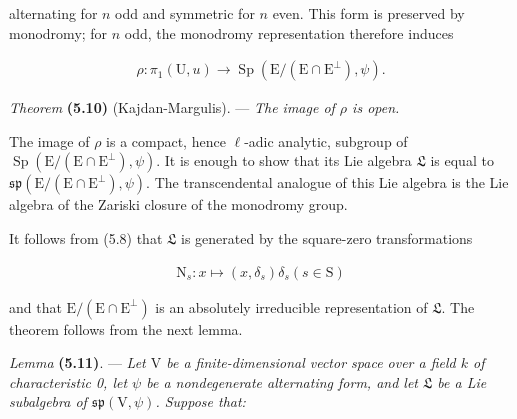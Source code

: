 \documentclass[10pt,leqno]{article}
\begin{document}
\noindent alternating for \(n\) odd and symmetric for \(n\) even. This form is preserved by monodromy; for \(n\) odd, the monodromy representation therefore induces\par

\begin{equation*}\begin{gathered}\rho  : \pi _{1}(\mathrm{U},u) \longrightarrow  \operatorname{Sp}(\mathrm{E}/(\mathrm{E}\cap \mathrm{E}^{\perp }),\psi ).\end{gathered}\end{equation*}

\noindent \emph{Theorem} \textbf{(5.10)} (Kajdan-Margulis). — {\itshape The image of \(\rho \) is open.}\par

\noindent The image of \(\rho \) is a compact, hence \(\ell \)-adic analytic, subgroup of \(\operatorname{Sp}(\mathrm{E}/(\mathrm{E}\cap \mathrm{E}^{\perp }),\psi )\). It is enough to show that its Lie algebra \(\mathfrak{L} \) is equal to \(\mathfrak{sp}(\mathrm{E}/(\mathrm{E}\cap \mathrm{E}^{\perp }),\psi )\). The transcendental analogue of this Lie algebra is the Lie algebra of the Zariski closure of the monodromy group.\par

\noindent It follows from (5.8) that \(\mathfrak{L} \) is generated by the square-zero transformations\par

\begin{equation*}\begin{gathered}\mathrm{N}_{s} : x \longmapsto  (x,\delta _{s})\delta _{s}    (s\in \mathrm{S})\end{gathered}\end{equation*}

\noindent and that \(\mathrm{E}/(\mathrm{E}\cap \mathrm{E}^{\perp })\) is an absolutely irreducible representation of \(\mathfrak{L} \). The theorem follows from the next lemma.\par

\noindent \emph{Lemma} \textbf{(5.11)}. — {\itshape Let \(\mathrm{V}\) be a finite-dimensional vector space over a field \(k\) of characteristic 0, let \(\psi \) be a nondegenerate alternating form, and let \(\mathfrak{L} \) be a Lie subalgebra of \(\mathfrak{sp}(\mathrm{V},\psi )\). Suppose that:}\par

\par
\end{document}
